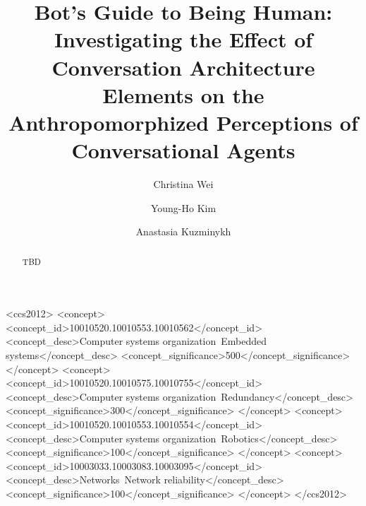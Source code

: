 \documentclass[sigconf,screen,review, anonymous]{acmart}
\begin{document}

\title[Bot's Guide to Being Human]{Bot's Guide to Being Human: Investigating the Effect of Conversation Architecture Elements on the Anthropomorphized Perceptions of Conversational Agents}


\author{Christina Wei}

\author{Young-Ho Kim}

\author{Anastasia Kuzminykh}

\renewcommand{\shortauthors}{Wei, Kim, and Kuzminykh}

\begin{abstract}
  TBD
\end{abstract}

\begin{CCSXML}
<ccs2012>
 <concept>
  <concept_id>10010520.10010553.10010562</concept_id>
  <concept_desc>Computer systems organization~Embedded systems</concept_desc>
  <concept_significance>500</concept_significance>
 </concept>
 <concept>
  <concept_id>10010520.10010575.10010755</concept_id>
  <concept_desc>Computer systems organization~Redundancy</concept_desc>
  <concept_significance>300</concept_significance>
 </concept>
 <concept>
  <concept_id>10010520.10010553.10010554</concept_id>
  <concept_desc>Computer systems organization~Robotics</concept_desc>
  <concept_significance>100</concept_significance>
 </concept>
 <concept>
  <concept_id>10003033.10003083.10003095</concept_id>
  <concept_desc>Networks~Network reliability</concept_desc>
  <concept_significance>100</concept_significance>
 </concept>
</ccs2012>
\end{CCSXML}
\end{document}
